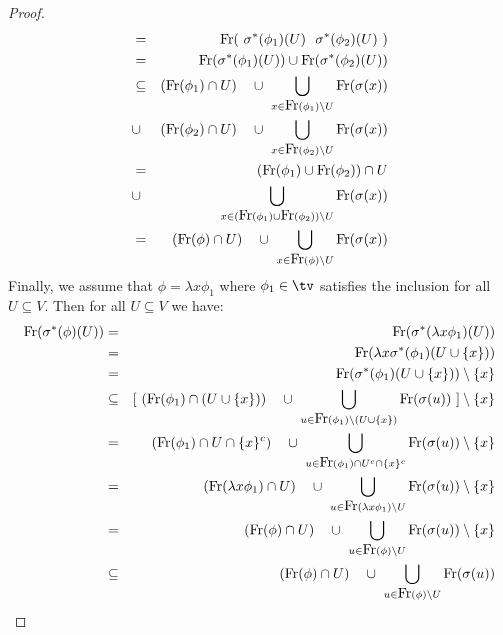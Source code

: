 \begin{proof}
\begin{eqnarray*}
        &=&\free(\ \sigma^{*}(\phi_{1})(U)\ \ \sigma^{*}(\phi_{2})(U)\ )\\
        &=&\free(\sigma^{*}(\phi_{1})(U))\cup\free(\sigma^{*}(\phi_{2})(U))\\
        &\subseteq&(\free(\phi_{1})\cap U)\ \ \ \cup\ 
            \bigcup_{x\in\free(\phi_{1})\setminus U} \free(\sigma(x))\\
        &\cup&(\free(\phi_{2})\cap U)\ \ \ \cup\ 
            \bigcup_{x\in\free(\phi_{2})\setminus U} \free(\sigma(x))\\
        &=&(\free(\phi_{1})\cup\free(\phi_{2}))\cap U\\
        &\cup&\bigcup_{x\in(\free(\phi_{1})\cup\free(\phi_{2}))\setminus U}
            \free(\sigma(x))\\
        &=&(\free(\phi)\cap U)\ \ \ \cup\ \bigcup_{x\in\free(\phi)\setminus U}
            \free(\sigma(x))
    \end{eqnarray*}
Finally, we assume that $\phi=\lambda x\phi_{1}$ where $\phi_{1}\in\tv$ 
satisfies the inclusion for all $U\subseteq V$. Then for all $U\subseteq V$ 
we have:
    \begin{eqnarray*}
        \free(\sigma^{*}(\phi)(U))
        &=&\free(\sigma^{*}(\lambda x\phi_{1})(U))\\
        &=&\free(\lambda x\sigma^{*}(\phi_{1})(U\cup\{x\}))\\
        &=&\free(\sigma^{*}(\phi_{1})(U\cup\{x\}))\setminus\{x\}\\
        &\subseteq& [\ (\free(\phi_{1})\cap(U\cup\{x\}))\ \ \ \cup\ 
            \bigcup_{u\in\free(\phi_{1})\setminus(U\cup\{x\})}\free(\sigma(u))
             \ ]\setminus\{x\}\\
        &=&(\free(\phi_{1})\cap U\cap \{x\}^{c})\ \ \ \cup\ 
            \bigcup_{u\in\free(\phi_{1})\cap U^{c}\cap\{x\}^{c}}
            \free(\sigma(u))\setminus\{x\}\\
        &=&(\free(\lambda x\phi_{1})\cap U)\ \ \ \cup\ 
            \bigcup_{u\in\free(\lambda x\phi_{1})\setminus U}
            \free(\sigma(u))\setminus\{x\}\\
        &=&(\free(\phi)\cap U)\ \ \ \cup\ \bigcup_{u\in\free(\phi)\setminus U} 
            \free(\sigma(u))\setminus\{x\}\\
        &\subseteq&(\free(\phi)\cap U)\ \ \ 
            \cup\ 
            \bigcup_{u\in\free(\phi)\setminus U}\free(\sigma(u))
    \end{eqnarray*}
\end{proof}

